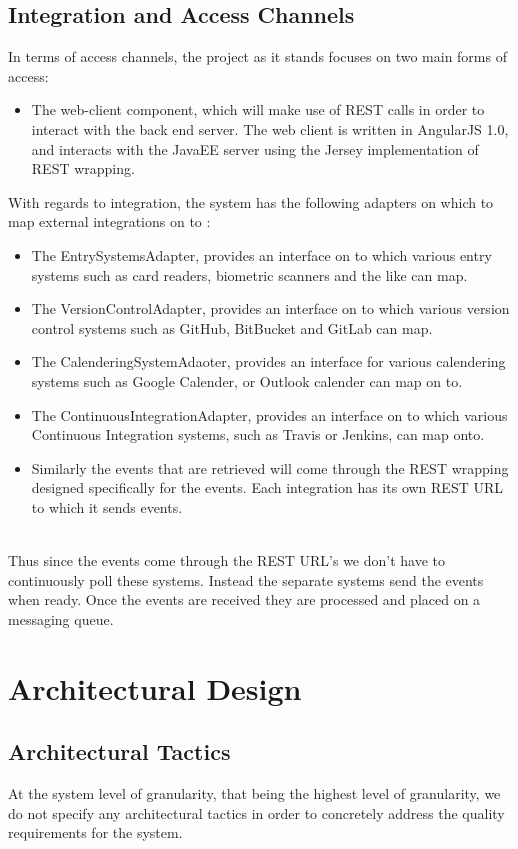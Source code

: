 \documentclass[11pt,a4paper]{article}
\begin{document}
\subsection{Integration and Access Channels}
In terms of access channels, the project as it stands focuses on two main forms of access:
\begin{itemize}
	\item The web-client component, which will make use of REST calls in order to interact with the back end server. The web client is written in AngularJS 1.0, and interacts with the JavaEE server using the Jersey implementation of REST wrapping.
\end{itemize}
With regards to integration, the system has the following adapters on which to map external integrations on to :
\begin{itemize}
	\item The EntrySystemsAdapter, provides an interface on to which various entry systems such as card readers, biometric scanners and the like can map.
	\item The VersionControlAdapter, provides an interface on to which various version control systems such as GitHub, BitBucket and GitLab can map.
	\item The CalenderingSystemAdaoter, provides an interface for various calendering systems such as Google Calender, or Outlook calender can map on to.
	\item The ContinuousIntegrationAdapter, provides an interface on to which various Continuous Integration systems, such as Travis or Jenkins, can map onto.
	
	\item Similarly the events that are retrieved will come through the REST wrapping designed specifically for the events. Each integration has its own REST URL to which it sends events. \\\\
\end{itemize}

Thus since the events come through the REST URL's we don't have to continuously poll these systems. Instead the separate systems send the events when ready. Once the events are received they are processed and placed on a messaging queue.

\pagebreak

\section{Architectural Design}
\subsection{Architectural Tactics}
At the system level of granularity, that being the highest level of granularity, we do not specify any architectural tactics in order to concretely address the quality requirements for the system.
\end{document}
